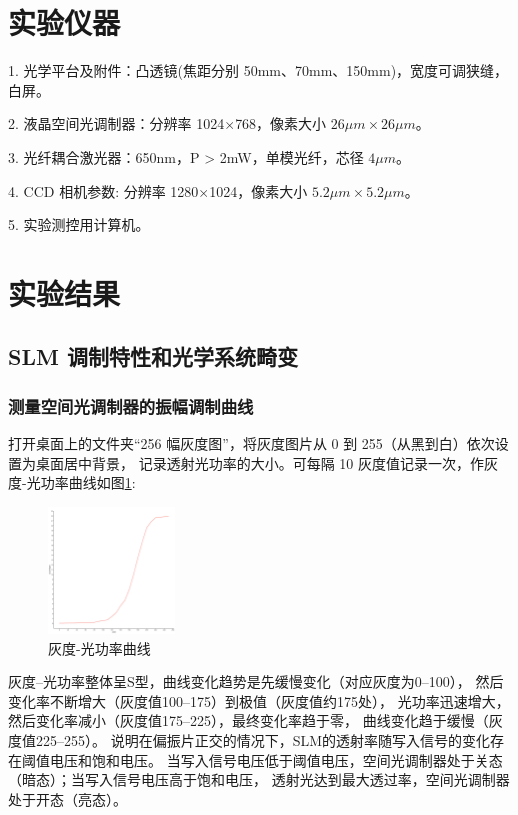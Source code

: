 \documentclass[10pt,a4paper,twoside,UTF8]{ctexart}
\begin{document}
\section{实验仪器}
1. 光学平台及附件：凸透镜(焦距分别 50mm、70mm、150mm)，宽度可调狭缝，白屏。

2. 液晶空间光调制器：分辨率 1024$\times$768，像素大小 $26\mu m\times26\mu m$。

3. 光纤耦合激光器：650nm，P > 2mW，单模光纤，芯径 $4\mu m$。

4. CCD 相机参数: 分辨率 1280$\times$1024，像素大小 $5.2\mu m\times5.2\mu m$。

5. 实验测控用计算机。


\section{实验结果}
\subsection{SLM 调制特性和光学系统畸变}
\subsubsection{测量空间光调制器的振幅调制曲线}
打开桌面上的文件夹“256 幅灰度图”，将灰度图片从 0 到 255（从黑到白）依次设置为桌面居中背景，
记录透射光功率的大小。可每隔 10 灰度值记录一次，作灰度-光功率曲线如图\ref{fig:plot}:

\begin{figure}[H]
	\centering
	\includegraphics[width=0.3\textwidth]{fig/plot.png}
	\caption{灰度-光功率曲线}
	\label{fig:plot}
\end{figure}

灰度--光功率整体呈S型，曲线变化趋势是先缓慢变化（对应灰度为0--100），
然后变化率不断增大（灰度值100--175）到极值（灰度值约175处），
光功率迅速增大，然后变化率减小（灰度值175--225），最终变化率趋于零，
曲线变化趋于缓慢（灰度值225--255）。
说明在偏振片正交的情况下，SLM的透射率随写入信号的变化存在阈值电压和饱和电压。
当写入信号电压低于阈值电压，空间光调制器处于关态（暗态）；当写入信号电压高于饱和电压，
透射光达到最大透过率，空间光调制器处于开态（亮态）。
\end{document}
